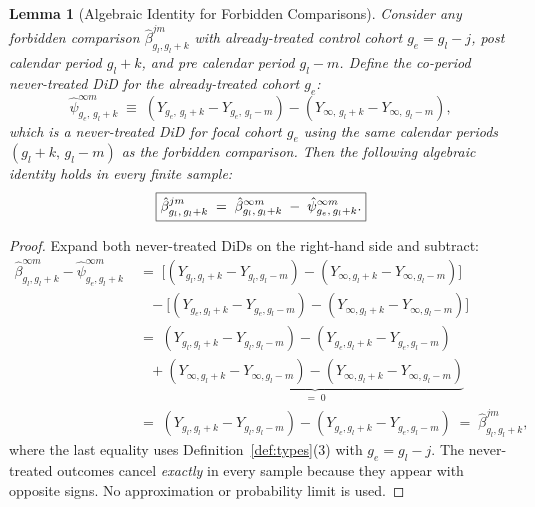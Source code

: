 \documentclass[12pt,letterpaper]{article}
\newtheorem{lemma}[theorem]{Lemma}
\theoremstyle{remark}
\theoremstyle{definition}
\newcommand{\hbeta}{\hat{\beta}}
\newcommand{\hpsi}{\hat{\psi}}     %
\begin{document}
\begin{lemma}[Algebraic Identity for Forbidden Comparisons]
  \label{lem:identity}
  Consider any forbidden comparison $\hbeta^{jm}_{g_l,g_l+k}$ with
  already-treated control cohort $g_e = g_l - j$, post calendar period
  $g_l + k$, and pre calendar period $g_l - m$. Define the
  \emph{co-period never-treated DiD} for the already-treated cohort $g_e$:
  \begin{equation}
    \hpsi^{\infty m}_{g_e,\,g_l+k}
    \;\equiv\;
    (Y_{g_e,\,g_l+k} - Y_{g_e,\,g_l-m})
    - (Y_{\infty,\,g_l+k} - Y_{\infty,\,g_l-m}),
    \label{eq:copd}
  \end{equation}
  which is a never-treated DiD for focal cohort $g_e$ using the \emph{same
  calendar periods} $(g_l+k,\,g_l-m)$ as the forbidden comparison.
  Then the following algebraic identity holds in every finite sample:
  \begin{equation}
    \boxed{%
      \hbeta^{jm}_{g_l,\,g_l+k}
      \;=\;
      \hbeta^{\infty m}_{g_l,\,g_l+k}
      \;-\;
      \hpsi^{\infty m}_{g_e,\,g_l+k}.
    }
    \label{eq:identity}
  \end{equation}
\end{lemma}

\begin{proof}
  Expand both never-treated DiDs on the right-hand side and subtract:
  \begin{align*}
    \hbeta^{\infty m}_{g_l,g_l+k} - \hpsi^{\infty m}_{g_e,g_l+k}
    &\;=\;
    \bigl[(Y_{g_l,g_l+k}-Y_{g_l,g_l-m})-(Y_{\infty,g_l+k}-Y_{\infty,g_l-m})\bigr]
    \\
    &\quad
    -\bigl[(Y_{g_e,g_l+k}-Y_{g_e,g_l-m})-(Y_{\infty,g_l+k}-Y_{\infty,g_l-m})\bigr]
    \\
    &\;=\;
    (Y_{g_l,g_l+k}-Y_{g_l,g_l-m})-(Y_{g_e,g_l+k}-Y_{g_e,g_l-m})
    \\
    &\quad
    +\underbrace{(Y_{\infty,g_l+k}-Y_{\infty,g_l-m})-(Y_{\infty,g_l+k}-Y_{\infty,g_l-m})}_{=\;0}
    \\
    &\;=\;
    (Y_{g_l,g_l+k}-Y_{g_l,g_l-m})-(Y_{g_e,g_l+k}-Y_{g_e,g_l-m})
    \;=\;
    \hbeta^{jm}_{g_l,g_l+k},
  \end{align*}
  where the last equality uses Definition~\ref{def:types}(3) with $g_e=g_l-j$.
  The never-treated outcomes cancel \emph{exactly} in every sample because they
  appear with opposite signs. No approximation or probability limit is used.
\end{proof}
\end{document}
